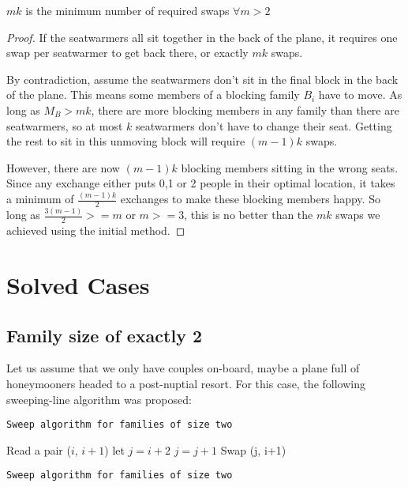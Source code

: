 \begin{lem}
$mk$ is the minimum number of required swaps $\forall m > 2$
\end{lem}

\begin{proof}
If the seatwarmers all sit together in the back of the plane, it requires one swap per seatwarmer to get back there, or exactly $mk$ swaps.  

By contradiction, assume the seatwarmers don't sit in the final block in the back of the plane.  This means some members of a blocking family $B_i$ have to move.  As long as $M_B > mk$, there are more blocking members in any family than there are seatwarmers, so at most $k$ seatwarmers don't have to change their seat.  Getting the rest to sit in this unmoving block will require $(m-1)k$ swaps.

However, there are now $(m-1)k$ blocking members sitting in the wrong seats.  Since any exchange either puts 0,1 or 2 people in their optimal location, it takes a minimum of $\frac{(m-1)k}{2}$ exchanges to make these blocking members happy.  So long as $\frac{3(m-1)}{2} >= m$ or $m>=3$, this is no better than the $mk$ swaps we achieved using the initial method.
\end{proof}


\section{Solved Cases}

\subsection{Family size of exactly 2}

\noindent
Let us assume that we only have couples on-board, maybe a plane full of honeymooners headed to a post-nuptial resort. For this case, the following sweeping-line algorithm was proposed:

\begin{algorithm}
\caption{ \texttt{Sweep algorithm for families of size two} }
\label{alg:twoSweep}
  \begin{algorithmic}
  \State Read a pair ($i$, $i+1$) 
   \State let $j = i+2$
      $j = j + 1$
   \EndWhile
   \State Swap (j, i+1)
  \EndIf
\EndWhile
\caption{ \texttt{Sweep algorithm for families of size two} }
\end{algorithmic}
\end{algorithm}
\FloatBarrier

